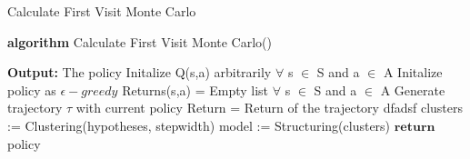 \documentclass[11pt,twoside,a4paper]{article}
\begin{document}
\begin{algorithm}
\caption{Calculate First Visit Monte Carlo}
\textbf{algorithm} Calculate First Visit Monte Carlo()
\begin{algorithmic}[1]
\Statex \textbf{Output:} The policy
\Statex
\State Initalize Q(s,a) arbitrarily $\forall$ s $\in$ S and a $\in$ A
\State Initalize policy as $\epsilon-greedy$
\State Returns(s,a) = Empty list $\forall$ s $\in$ S and a $\in$ A
\State Generate trajectory $\tau$ with current policy
\State Return = Return of the trajectory
\State dfadsf
\EndFor
\EndFor
\State clusters := Clustering(hypotheses, stepwidth)
\State model := Structuring(clusters)
\State $\textbf{return}$ policy
\end{algorithmic}
\end{algorithm}
\end{document}
